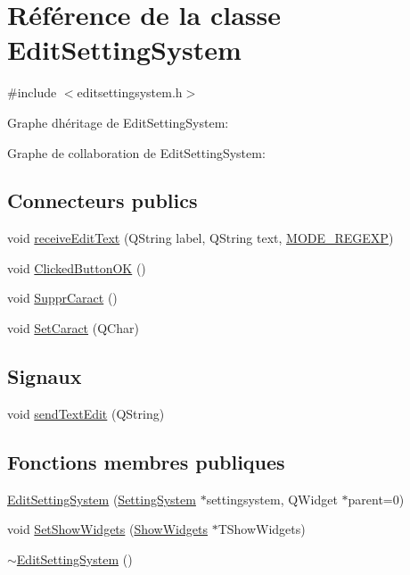 \hypertarget{class_edit_setting_system}{}\section{Référence de la classe Edit\+Setting\+System}
\label{class_edit_setting_system}


{\ttfamily \#include $<$editsettingsystem.\+h$>$}



Graphe d\textquotesingle{}héritage de Edit\+Setting\+System\+:


Graphe de collaboration de Edit\+Setting\+System\+:
\subsection*{Connecteurs publics}
\begin{DoxyCompactItemize}
\item 
void \hyperlink{class_edit_setting_system_ae8fa0953fab689846437a15192b91117}{receive\+Edit\+Text} (Q\+String label, Q\+String text, \hyperlink{editsettingsystem_8h_a5227ca4f7424412312f0ed756359c612}{M\+O\+D\+E\+\_\+\+R\+E\+G\+E\+X\+P})
\item 
void \hyperlink{class_edit_setting_system_a0230f232fa5cade594876401cc1bfe92}{Clicked\+Button\+O\+K} ()
\item 
void \hyperlink{class_edit_setting_system_ab0b637804f3e0904b8f13714e8a8e1a9}{Suppr\+Caract} ()
\item 
void \hyperlink{class_edit_setting_system_a367fea2c8e5aa3c2eb0af5dc6de1f90c}{Set\+Caract} (Q\+Char)
\end{DoxyCompactItemize}
\subsection*{Signaux}
\begin{DoxyCompactItemize}
\item 
void \hyperlink{class_edit_setting_system_a29301fed5fbeacd6eec6ee2c4634839c}{send\+Text\+Edit} (Q\+String)
\end{DoxyCompactItemize}
\subsection*{Fonctions membres publiques}
\begin{DoxyCompactItemize}
\item 
\hyperlink{class_edit_setting_system_a893af9b47c9107f1549d7f37f24ad07a}{Edit\+Setting\+System} (\hyperlink{class_setting_system}{Setting\+System} $\ast$settingsystem, Q\+Widget $\ast$parent=0)
\item 
void \hyperlink{class_edit_setting_system_a297afd40d41aac67a7260a32dbdd78d5}{Set\+Show\+Widgets} (\hyperlink{class_show_widgets}{Show\+Widgets} $\ast$T\+Show\+Widgets)
\item 
\hyperlink{class_edit_setting_system_a0eb0a8459c84581545828927e8e63e7f}{$\sim$\+Edit\+Setting\+System} ()
\end{DoxyCompactItemize}


